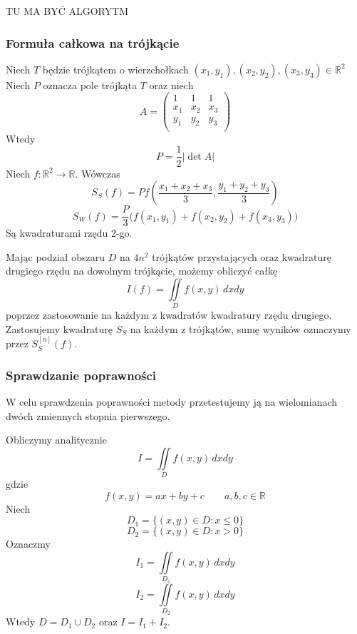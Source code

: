 \documentclass[9pt]{beamer}
\begin{document}
\begin{frame}
    TU MA BYĆ ALGORYTM
\end{frame}


\begin{frame}
    \frametitle{Formuła całkowa na trójkącie}
    Niech $T$ będzie trójkątem o wierzchołkach $(x_1,y_1), (x_2,y_2), (x_3,y_3) \in \mathbb{R}^2$
    Niech $P$ oznacza pole trójkąta $T$ oraz niech 
    $$ A = \begin{pmatrix}
    	1 & 1 & 1 \\
    	x_1 & x_2 & x_3 \\
    	y_1 & y_2 & y_3 \\
    \end{pmatrix} $$
    Wtedy $$P = \frac{1}{2}|\det{A}|$$
    Niech $f : \mathbb{R}^2 \to \mathbb{R}$. Wówczas 
    $$S_S(f) = P f \left(\frac{x_1+x_2+x_3}{3},\frac{y_1+y_2+y_3}{3} \right) $$
    $$S_W(f) = \frac{P}{3} \Big( f(x_1,y_1) + f(x_2,y_2) + f(x_3,y_3) \Big)$$
    Są kwadraturami rzędu 2-go.
    
\end{frame}

\begin{frame}
	 \begin{spacing}{1.5}
	Mając podział obszaru $D$ na $4n^2$ trójkątów przystających oraz kwadraturę drugiego rzędu na dowolnym trójkącie, możemy obliczyć całkę $$ I(f) = \iint\limits_D f(x,y)  \, dxdy $$ poprzez zastosowanie na każdym z kwadratów kwadratury rzędu drugiego.\\
	
	Zastosujemy kwadraturę $S_S$ na każdym z trójkątów, sumę wyników oznaczymy przez $S_S^{[n]}(f)$.\\
	
	
	\end{spacing}
\end{frame}

\begin{frame}
\frametitle{Sprawdzanie poprawności}

    \begin{spacing}{1}
        W celu sprawdzenia poprawności metody przetestujemy ją na wielomianach dwóch zmiennych stopnia pierwszego.\par
        Obliczymy analitycznie 
        $$ I = \iint\limits_D f(x,y) \, dx dy $$ 
        gdzie
        $$ f(x,y) = ax + by + c \qquad a,b,c \in \mathbb{R}$$
        Niech 
        $$ D_1 = \{(x,y) \in D : x \leq 0\} $$ 
        $$ D_2 = \{(x,y) \in D : x > 0\} $$ 
        Oznaczmy 
        $$ I_1 = \iint\limits_{D_1} f(x,y) \, dx dy $$ 
        $$ I_2 = \iint\limits_{D_2} f(x,y) \, dx dy $$ 
        Wtedy $ D = D_1 \cup D_2 $ oraz $ I = I_1 + I_2 $.
    \end{spacing}

\end{frame}
\end{document}
